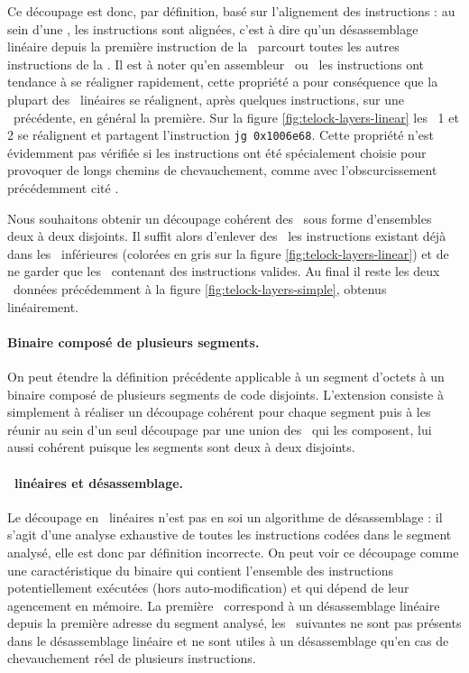 Ce découpage est donc, par définition, basé sur l'alignement des instructions : au sein d'une \layer, les instructions sont alignées, c'est à dire qu'un désassemblage linéaire depuis la première instruction de la \layer\ parcourt toutes les autres instructions de la \layer. 
Il est à noter qu'en assembleur \xq\ ou \xs\ les instructions ont tendance à se réaligner rapidement, 
cette propriété a pour conséquence que la plupart des \layers\ linéaires se réalignent, après quelques instructions, sur une \layer\ précédente, en général la première. Sur la figure \ref{fig:telock-layers-linear} les \layers\ 1 et 2 se réalignent et partagent l'instruction \texttt{jg 0x1006e68}.
Cette propriété n'est évidemment pas vérifiée si les instructions ont été spécialement choisie pour provoquer de longs chemins de chevauchement, comme avec l'obscurcissement précédemment cité \cite{JLH13}.

Nous souhaitons obtenir un découpage cohérent des \layers\ sous forme d'ensembles deux à deux disjoints.
Il suffit alors d'enlever des \layers\ les instructions existant déjà dans les \layers\ inférieures (colorées en gris sur la figure \ref{fig:telock-layers-linear}) et de ne garder que les \layers\ contenant des instructions valides.
Au final il reste les deux \layers\ données précédemment à la figure \ref{fig:telock-layers-simple}, obtenus linéairement.

\paragraph{Binaire composé de plusieurs segments.}
On peut étendre la définition précédente applicable à un segment d'octets à un binaire composé de plusieurs segments de code disjoints.
L'extension consiste à simplement à réaliser un découpage cohérent pour chaque segment puis à les réunir au sein d'un seul découpage par une union des \layers\ qui les composent, lui aussi cohérent puisque les segments sont deux à deux disjoints.

\paragraph{\Layers\ linéaires et désassemblage.}
Le découpage en \layers\ linéaires n'est pas en soi un algorithme de désassemblage : il s'agit d'une analyse exhaustive de toutes les instructions codées dans le segment analysé, elle est donc par définition incorrecte.
On peut voir ce découpage comme une caractéristique du binaire qui contient l'ensemble des instructions potentiellement exécutées (hors auto-modification) et qui dépend de leur agencement en mémoire.
La première \layer\ correspond à un désassemblage linéaire depuis la première adresse du segment analysé, les \layers\ suivantes ne sont pas présents dans le désassemblage linéaire et ne sont utiles à un désassemblage qu'en cas de chevauchement réel de plusieurs instructions.

